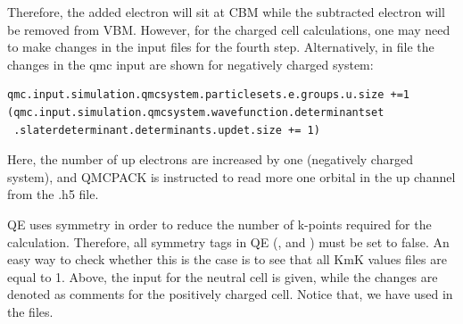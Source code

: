 Therefore, the added electron will sit at CBM while the subtracted electron will be removed from VBM. 
However, for the charged cell calculations, one may need to make changes in the input files for the fourth step.  Alternatively, in  file the changes in the qmc input are shown for negatively charged system:
\begin{lstlisting}[style=Python]
qmc.input.simulation.qmcsystem.particlesets.e.groups.u.size +=1
(qmc.input.simulation.qmcsystem.wavefunction.determinantset
 .slaterdeterminant.determinants.updet.size += 1)
\end{lstlisting}
Here, the number of up electrons are increased by one (negatively charged system), and QMCPACK is instructed to read more one orbital in the up channel from the .h5 file. 

QE uses symmetry in order to reduce the number of k-points required for the calculation. 
Therefore, all symmetry tags in QE (,  and ) must be set to false. 
An easy way to check whether this is the case is to see that all KmK values  files are equal to 1. 
Above, the input for the neutral cell is given, while the changes are denoted as comments for the positively charged cell. 
Notice that, we have used  in the  files.
